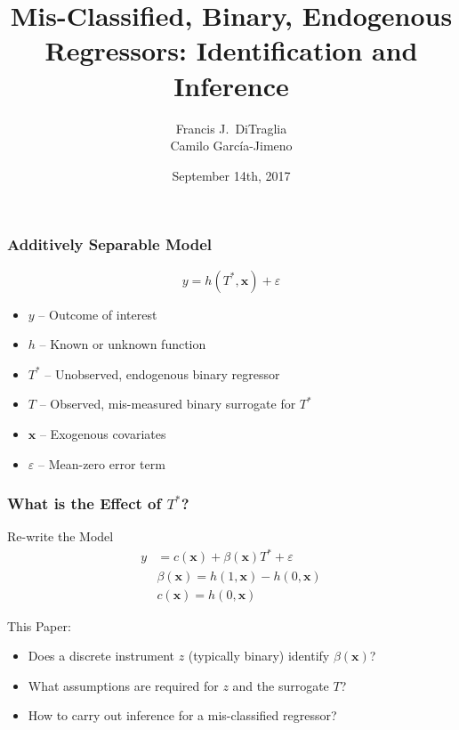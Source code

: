 \documentclass{beamer}
\title[Binary Regressors]{Mis-Classified, Binary, Endogenous Regressors: Identification and Inference}
\author[FJ DiTraglia]{Francis J.\ DiTraglia\\ Camilo Garc\'{i}a-Jimeno}
\institute{University of Pennsylvania}
\date{September 14th, 2017}
\begin{document}
 

\begin{frame}[plain]
	\titlepage 
\end{frame} 
\begin{frame}
  \frametitle{Additively Separable Model}
\[
  y = h(T^*, \mathbf{x}) + \varepsilon
\]
\vspace{-1em}
    \begin{itemize}    
    \item $y$ -- Outcome of interest
    \item $h$ -- Known or unknown function 
    \item $T^*$ -- Unobserved, endogenous binary regressor
    \item $T$ -- Observed, mis-measured binary surrogate for $T^*$
    \item $\mathbf{x}$ -- Exogenous covariates
    \item $\varepsilon$ -- Mean-zero error term
  \end{itemize}

\end{frame}
\begin{frame}
  \frametitle{What is the Effect of $T^*$?}
 
  \begin{block}{Re-write the Model}
\begin{align*}
  y &= c(\mathbf{x}) + \beta(\mathbf{x}) T^* + \varepsilon\\
  &\beta(\mathbf{x}) = h(1,\mathbf{x}) - h(0,\mathbf{x})\\
  &c(\mathbf{x}) = h(0,\mathbf{x})
\end{align*}
  \end{block}

  \begin{alertblock}{This Paper:}
    \begin{itemize}
      \item Does a discrete instrument $z$ (typically binary) identify $\beta(\mathbf{x})$? 
      \item What assumptions are required for $z$ and the surrogate $T$?
      \item How to carry out inference for a mis-classified regressor?
    \end{itemize}
  \end{alertblock}
\end{frame}
\end{document}
